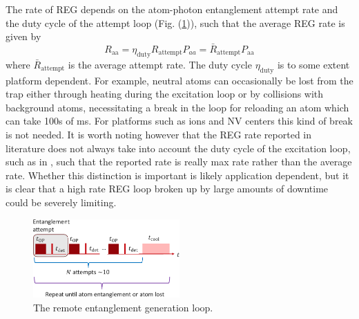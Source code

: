 The rate of REG depends on the atom-photon entanglement attempt rate and the duty cycle of the attempt loop (Fig. (\ref{fig:REG_loop})), such that the average REG rate is given by
\begin{equation}\label{eq:Raa}
    R_{\text{aa}} = \eta_{\text{duty}}R_{\text{attempt}}P_{a   a} = \bar{R}_{\text{attempt}}P_{\text{aa}}
\end{equation}
where $\bar{R}_{\text{attempt}}$ is the average attempt rate. The duty cycle $\eta_{\text{duty}}$ is to some extent platform dependent. For example, neutral atoms can occasionally be lost from the trap either through heating during the excitation loop or by collisions with background atoms, necessitating a break in the loop for reloading an atom which can take 100s of ms. For platforms such as ions and NV centers this kind of break is not needed. It is worth noting however that the REG rate reported in literature does not always take into account the duty cycle of the excitation loop, such as in \cite{Young2022}, such that the reported rate is really max rate rather than the average rate. Whether this distinction is important is likely application dependent, but it is clear that a high rate REG loop broken up by large amounts of downtime could be severely limiting.

\begin{figure}[!ht]
    \centering
    \includegraphics[width=0.5\textwidth]{Images/entanglement_attempt_loop.pdf}
    \caption{The remote entanglement generation loop.}
    \label{fig:REG_loop}
\end{figure}

